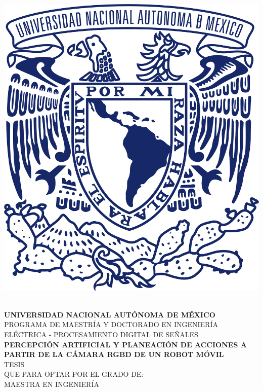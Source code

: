 \begin{center}
\thispagestyle{empty}				
\newcommand{\HRule}{\rule{\linewidth}{0.5mm}}
\begin{minipage}{\textwidth} \begin{center}
\includegraphics[scale = 0.3]{Figures/UNAM_blue.png}
\end{center}\end{minipage}
\vspace*{1cm}\\
\textbf{\textsc{\large UNIVERSIDAD NACIONAL AUTÓNOMA DE MÉXICO}}\\[0.3cm]

\textsc{PROGRAMA DE MAESTRÍA Y DOCTORADO EN INGENIERÍA}\\[0.3cm]

\textsc{ELÉCTRICA - PROCESAMIENTO DIGITAL DE SEÑALES}\\[1cm]
						
\textbf{\textsc{PERCEPCIÓN ARTIFICIAL Y PLANEACIÓN DE ACCIONES A PARTIR DE LA CÁMARA RGBD DE UN ROBOT MÓVIL}}
\\[1cm]

\textsc{TESIS}\\
\vspace*{0.2cm}
\textsc{QUE PARA OPTAR POR EL GRADO DE:}\\
\vspace*{0.2cm}
\textsc{MAESTRA EN INGENIERÍA}\\
\vspace*{1cm}


\end{center}
